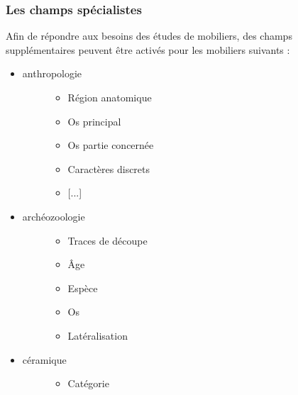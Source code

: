 \documentclass[letterpaper,10pt,french]{sphinxmanual}
\begin{document}
\subsubsection{Les champs spécialistes}
\label{manuel/formulaire_mobilier:les-champs-specialistes}
Afin de répondre aux besoins des études de mobiliers, des champs supplémentaires peuvent être activés pour les mobiliers suivants :
\begin{itemize}
\item {} \begin{description}
\item[{anthropologie}] \leavevmode\begin{itemize}
\item {} 
Région anatomique

\item {} 
Os principal

\item {} 
Os partie concernée

\item {} 
Caractères discrets

\item {} 
{[}...{]}

\end{itemize}

\end{description}

\item {} \begin{description}
\item[{archéozoologie}] \leavevmode\begin{itemize}
\item {} 
Traces de découpe

\item {} 
Âge

\item {} 
Espèce

\item {} 
Os

\item {} 
Latéralisation

\end{itemize}

\end{description}

\item {} \begin{description}
\item[{céramique}] \leavevmode\begin{itemize}
\item {} 
Catégorie


\end{itemize}
\end{description}
\end{itemize}
\end{document}
